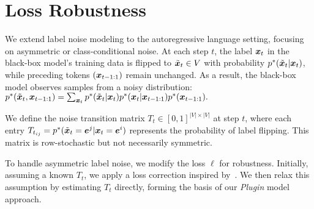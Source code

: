 
\section{Loss Robustness}
\label{sec:robustness}




We extend label noise modeling to the autoregressive language setting, focusing on asymmetric or class-conditional noise. At each step $t$, the label $\bm{x}_t$ in the black-box model’s training data is flipped to $\tilde {\bm{x}}_t \in V$ with probability $p^*(\tilde {\bm{x}}_t|\bm{x}_t)$, while preceding tokens $(\bm{x}_{t-1:1})$ remain unchanged. As a result, the black-box model observes samples from a noisy distribution: $p^*(\tilde {\bm{x}}_t, \bm{x}_{t-1:1}) = \sum_{\bm{x}_t} p^*(\tilde {\bm{x}}_t | \bm{x}_t) p^*(\bm{x}_t|\bm{x}_{t-1:1}) p^*(\bm{x}_{t-1:1}).$

We define the noise transition matrix $T_t \in [0,1]^{|V|\times |V|}$ at step $t$, where each entry $T_{t_{ij}} = p^*(\tilde {\bm{x}}_t = \bm{e}^j | \bm{x}_t = \bm{e}^i)$ represents the probability of label flipping. This matrix is row-stochastic but not necessarily symmetric.

To handle asymmetric label noise, we modify the loss $\bm{\ell}$ for robustness. Initially, assuming a known $T_t$, we apply a loss correction inspired by~\citep{patrini2017making, sukhbaatar2015training}. We then relax this assumption by estimating $T_t$ directly, forming the basis of our \textit{Plugin} model approach.

